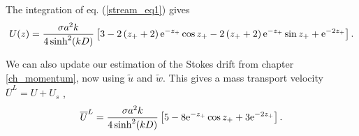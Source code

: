 The integration of eq. (\ref{stream_eq1}) gives 
\begin{equation}
U(z)= \frac{\sigma a^2 k}{4 \sinh^2(kD)} \left[3 - 2 \left(z_+ + 2\right) \mathrm{e}^{- z_+} \cos z_+
- 2 \left(z_+ +2\right) \mathrm{e}^{- z_+} \sin z_+
                                            + \mathrm{e}^{-2 z_+} \right].\label{ruissellement_Eulerien}
\end{equation}

We can also update our estimation of the Stokes drift from chapter \ref{ch_momentum}, now using   $\widetilde{u}$ and
$\widetilde{w}$. This gives a mass transport velocity $\overline{U}^L=U+U_s$ \citep{Longuet-Higgins1953}, 
\begin{equation}
\overline{U}^L= \frac{\sigma a^2 k}{4 \sinh^2(kD)} \left[5 - 8  \mathrm{e}^{- z_+} \cos z_+ +3  \mathrm{e}^{-2 z_+} \right].
\end{equation}

